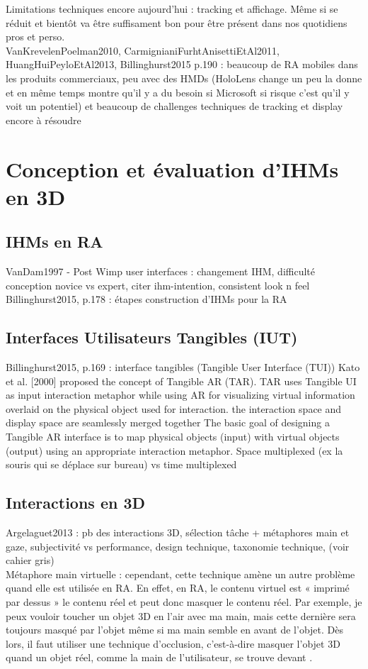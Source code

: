 Limitations techniques encore aujourd'hui : tracking et affichage. Même si se réduit et bientôt va être suffisament bon pour être présent dans nos quotidiens pros et perso.\\
VanKrevelenPoelman2010, CarmignianiFurhtAnisettiEtAl2011, HuangHuiPeyloEtAl2013, Billinghurst2015 p.190 : beaucoup de RA mobiles dans les produits commerciaux, peu avec des HMDs (HoloLens change un peu la donne et en même temps montre qu'il y a du besoin si Microsoft si risque c'est qu'il y voit un potentiel) et beaucoup de challenges techniques de tracking et display encore à résoudre


\section{Conception et évaluation d'IHMs en 3D}
\subsection{IHMs en RA}
VanDam1997 - Post Wimp user interfaces : changement IHM, difficulté conception novice vs expert, citer ihm-intention, consistent look n feel
Billinghurst2015, p.178 : étapes construction d'IHMs pour la RA

\subsection{Interfaces Utilisateurs Tangibles (IUT)}
Billinghurst2015, p.169 : interface tangibles (Tangible User Interface (TUI))
Kato et al. [2000] proposed the concept of Tangible AR (TAR). TAR uses Tangible UI as input interaction metaphor while using AR for visualizing virtual information overlaid on the physical object used for interaction. the interaction space and display space are seamlessly merged together
The basic goal of designing a Tangible AR interface is to map physical objects (input) with virtual objects (output) using an appropriate interaction metaphor.
Space multiplexed (ex la souris qui se déplace sur bureau) vs time multiplexed

\subsection{Interactions en 3D}
Argelaguet2013 : pb des interactions 3D, sélection tâche + métaphores main et gaze, subjectivité vs performance, design technique, taxonomie technique,  (voir cahier gris)\\
Métaphore main virtuelle : cependant, cette technique amène un autre problème quand elle est utilisée en RA. En effet, en RA, le contenu virtuel est « imprimé par dessus » le contenu réel et peut donc masquer le contenu réel. Par exemple, je peux vouloir toucher un objet 3D en l'air avec ma main, mais cette dernière sera toujours masqué par l'objet même si ma main semble en avant de l'objet. Dès lors, il faut utiliser une technique d'occlusion, c'est-à-dire masquer l'objet 3D quand un objet réel, comme la main de l'utilisateur, se trouve devant .

